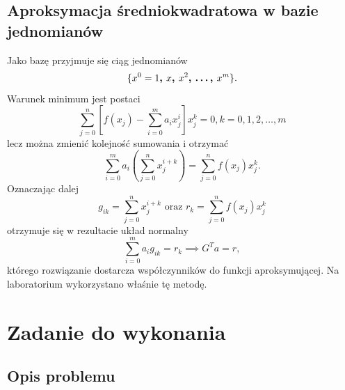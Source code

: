 \subsection{Aproksymacja średniokwadratowa w bazie jednomianów}

Jako bazę przyjmuje się ciąg jednomianów 
\begin{equation}
\{\textbf{$ x^0 = 1$, $x$, $x^2$, \dots, $x^m$}\}.
\end{equation}
Warunek minimum jest postaci
\begin{equation}
\sum_{j=0}^{n}\left[f(x_j) - \sum_{i=0}^{m}a_ix_j^i\right]x_j^k = 0, k = 0, 1, 2, \dots, m
\end{equation}
lecz można zmienić kolejność sumowania i otrzymać
\begin{equation}
\sum_{i=0}^{m}a_i\left(\sum_{j=0}^{n}x_j^{i+k}\right) = \sum_{j=0}^{n}f(x_j)x_j^k.
\end{equation}
Oznaczając dalej
\begin{equation}
g_{ik} = \sum_{j=0}^{n}x_j^{i+k} \text{ oraz } r_k = \sum_{j=0}^{n}f(x_j)x_j^k
\end{equation}
otrzymuje się w rezultacie układ normalny
\begin{equation}
\sum_{i=0}^{m}a_ig_{ik} = r_k \implies G^Ta = r,
\end{equation}
którego rozwiązanie dostarcza współczynników do funkcji aproksymującej. Na laboratorium wykorzystano właśnie tę metodę.
\section{Zadanie do wykonania}

\subsection{Opis problemu}

